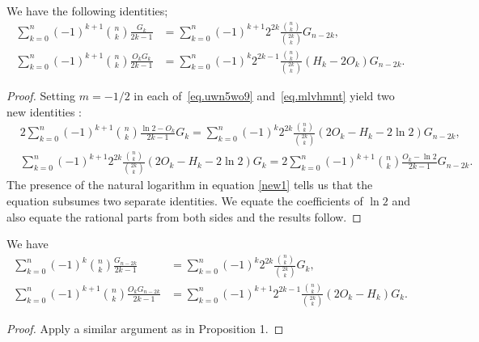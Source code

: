 \documentclass[12pt,reqno]{article}
\begin{document}
\begin{prop}
We have the following identities;
\begin{align}
\sum_{k=0}^n (-1)^{k+1} \binom{n}{k}\frac{G_k}{2k-1} &= \sum_{k=0}^n (-1)^{k+1} 2^{2k}\frac{\binom{n}{k}}{\binom{2k}{k}}G_{n-2k}, \label{irration1}\\
\sum_{k=0}^n (-1)^{k+1} \binom{n}{k}\frac{O_kG_k}{2k-1} &= \sum_{k=0}^n (-1)^{k} 2^{2k-1}\frac{\binom{n}{k}}{\binom{2k}{k}}\left(H_k-2O_k\right)G_{n-2k}.\label{irration2}
\end{align}	
\end{prop}
\begin{proof}
Setting $m=-1/2$ in each of~\eqref{eq.uwn5wo9} and~\eqref{eq.mlvhmnt} yield two new identities :
\begin{align}
&2\sum_{k=0}^n (-1)^{k+1} \binom{n}{k} \frac{\ln 2-O_k}{2k-1}G_k = \sum_{k=0}^n (-1)^k 2^{2k}\frac{\binom{n}{k}}{\binom{2k}{k}}(2O_k-H_k-2\ln 2)G_{n-2k}, \label{new1}\\
&\sum_{k=0}^n (-1)^{k+1} 2^{2k} \frac{\binom{n}{k}}{\binom{2k}{k}}(2O_k-H_k-2\ln 2)G_{k} = 2\sum_{k=0}^n (-1)^{k+1} \binom{n}{k}\frac{O_k-\ln 2}{2k-1}G_{n-2k}. \label{new2}
\end{align}
The presence of the natural logarithm in equation \eqref{new1} tells us that the equation subsumes two separate identities. We equate the coefficients of $\ln 2$ and also equate the rational parts from both sides and the results follow.
\end{proof}

\begin{prop}
We have
\begin{align}
\sum_{k=0}^n (-1)^k \binom{n}{k}\frac{G_{n-2k}}{2k-1} &= \sum_{k=0}^n (-1)^k 2^{2k}\frac{\binom{n}{k}}{\binom{2k}{k}}G_k, \label{irration3}\\
\sum_{k=0}^n (-1)^{k+1} \binom{n}{k}\frac{O_k G_{n-2k}}{2k-1} &= \sum_{k=0}^n (-1)^{k+1}2^{2k-1}\frac{\binom{n}{k}}{\binom{2k}{k}}\left(2O_k-H_k\right)G_k.\label{irration4}
\end{align}
\end{prop}
\begin{proof}
Apply a similar argument as in Proposition 1.
\end{proof}
\end{document}
